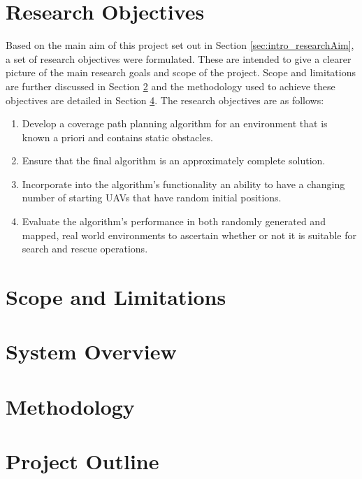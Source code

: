 \section{Research Objectives}
\label{sec:intro_Objectives}
Based on the main aim of this project set out in Section \ref{sec:intro_researchAim}, a set of research objectives were formulated. These are intended to give a clearer picture of the main research goals and scope of the project. Scope and limitations are further discussed in Section \ref{sec:intro_scope} and the methodology used to achieve these objectives are detailed in Section \ref{sec:intro_method}. The research objectives are as follows:
\begin{enumerate}
	\item Develop a coverage path planning algorithm for an environment that is known a priori and contains static obstacles.
	\item Ensure that the final algorithm is an approximately complete solution.
	\item Incorporate into the algorithm's functionality an ability to have a changing number of starting UAVs that have random initial positions.
	\item Evaluate the algorithm's performance in both randomly generated and mapped, real world environments to ascertain whether or not it is suitable for search and rescue operations.
\end{enumerate}

\section{Scope and Limitations}
\label{sec:intro_scope}

\section{System Overview}

\section{Methodology}
\label{sec:intro_method}

\section{Project Outline}
\label{sec:intro_struct}
